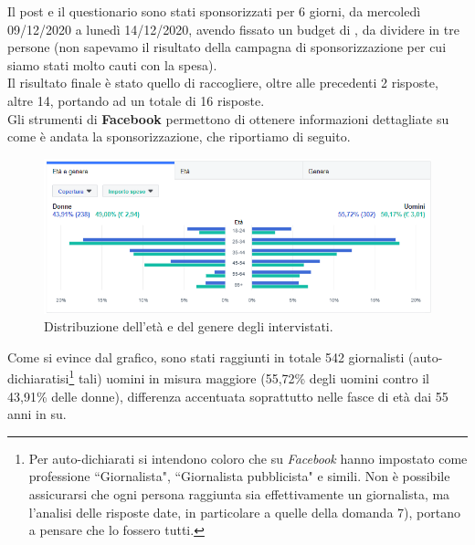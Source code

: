 Il post e il questionario sono stati sponsorizzati per 6 giorni, da mercoledì 09/12/2020 a lunedì 14/12/2020, avendo fissato un budget di , da dividere in tre persone (non sapevamo il risultato della campagna di sponsorizzazione per cui siamo stati molto cauti con la spesa).\\
Il risultato finale è stato quello di raccogliere, oltre alle precedenti 2 risposte, altre 14, portando ad un totale di 16 risposte.\\
Gli strumenti di \textbf{Facebook} permettono di ottenere informazioni dettagliate su come è andata la sponsorizzazione, che riportiamo di seguito.

\begin{figure}[!h] 
    \centering 
    \includegraphics[width=0.9\columnwidth]{assets/images/ricerca-etnografica/post-facebook-statistiche-eta-genere} 
    \caption{Distribuzione dell'età e del genere degli intervistati.}
\end{figure}
Come si evince dal grafico, sono stati raggiunti in totale 542 giornalisti (auto-dichiaratisi\footnote{Per auto-dichiarati si intendono coloro che su \textit{Facebook} hanno impostato come professione ``Giornalista", ``Giornalista pubblicista" e simili. Non è possibile assicurarsi che ogni persona raggiunta sia effettivamente un giornalista, ma l'analisi delle risposte date, in particolare a quelle della domanda 7), portano a pensare che lo fossero tutti.} tali) uomini in misura maggiore (55,72\% degli uomini contro il 43,91\% delle donne), differenza accentuata soprattutto nelle fasce di età dai 55 anni in su.

